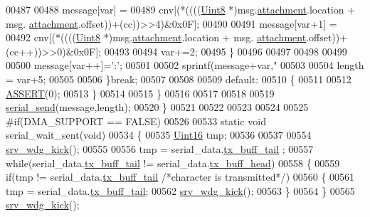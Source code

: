 \begin{DoxyCode}
{{{{{00487 
00488                    message[var]   =
00489                     cnv[(*((((\hyperlink{a00070_af84840501dec18061d18a68c162a8fa2}{Uint8} *)msg.\hyperlink{a00029_a040f6d5d58d18d8aeaf447eda7f50172}{attachment}.location + msg.
      \hyperlink{a00029_a040f6d5d58d18d8aeaf447eda7f50172}{attachment}.offset))+(cc))>>4)&0x0F];
00490 
00491                    message[var+1]   =
00492                     cnv[(*((((\hyperlink{a00070_af84840501dec18061d18a68c162a8fa2}{Uint8} *)msg.\hyperlink{a00029_a040f6d5d58d18d8aeaf447eda7f50172}{attachment}.location + msg.
      \hyperlink{a00029_a040f6d5d58d18d8aeaf447eda7f50172}{attachment}.offset))+(cc++))>>0)&0x0F];
00493 
00494                    var+=2;
00495        \}
00496 
00497   
00498      
00499 
00500        message[var++]=\textcolor{charliteral}{':'};
00501 
00502        sprintf(message+var,\textcolor{stringliteral}{"%
00503 
00504        length = var+5;
00505        
00506        \}\textcolor{keywordflow}{break};
00507 
00508 
00509         \textcolor{keywordflow}{default}:
00510         \{
00511 
00512             \hyperlink{a00070_abb8ff8e213ac9f6fb21d2b968583b936}{ASSERT}(0);
00513         \}
00514 
00515  \}
00516 
00517 
00518 
00519     \hyperlink{a00028_a17f65cf9dbacdfb97cb2536ed0097ccb}{serial\_send}(message,length);
00520 \}
00521 
00522 
00523 
00524 
00525 \textcolor{preprocessor}{#if(DMA\_SUPPORT == FALSE)}
00526 
00533 \textcolor{keyword}{static} \textcolor{keywordtype}{void}  serial\_wait\_sent(\textcolor{keywordtype}{void})
00534 \{
00535     \hyperlink{a00070_a59a9f6be4562c327cbfb4f7e8e18f08b}{Uint16} tmp;
00536 
00537 
00554     \hyperlink{a00065_a710d148845397582739d170341f3d3d9}{srv\_wdg\_kick}();
00555 
00556     tmp = serial\_data.\hyperlink{a00028_a6287e1447d7902b8bbc2f6359065dcbd}{tx\_buff\_tail} ;
00557     \textcolor{keywordflow}{while}(serial\_data.\hyperlink{a00028_a6287e1447d7902b8bbc2f6359065dcbd}{tx\_buff\_tail} != serial\_data.\hyperlink{a00028_a3e2eda0a020422511de91b2bc7386083}{tx\_buff\_head})
00558     \{
00559         \textcolor{keywordflow}{if}(tmp != serial\_data.\hyperlink{a00028_a6287e1447d7902b8bbc2f6359065dcbd}{tx\_buff\_tail} \textcolor{comment}{/*character is transmitted*/})
00560         \{
00561            tmp = serial\_data.\hyperlink{a00028_a6287e1447d7902b8bbc2f6359065dcbd}{tx\_buff\_tail};
00562            \hyperlink{a00065_a710d148845397582739d170341f3d3d9}{srv\_wdg\_kick}();
00563         \}
00564     \}
00565     \hyperlink{a00065_a710d148845397582739d170341f3d3d9}{srv\_wdg\_kick}();
}}}}}}
\end{DoxyCode}
